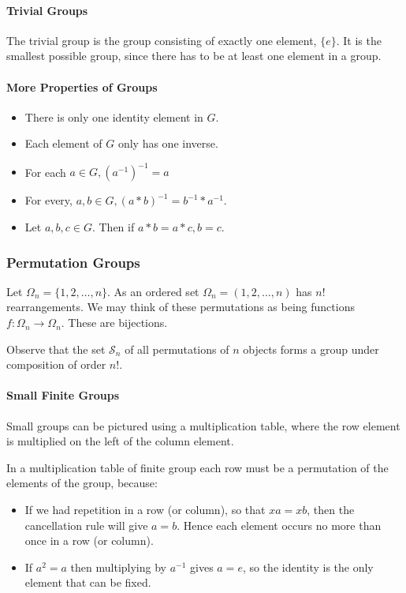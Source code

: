 \paragraph{Trivial Groups}
The trivial group is the group consisting of exactly one element, \(\{e\}\). It is the smallest possible group, since there has to be at least one element in a group.

\paragraph{More Properties of Groups}
\begin{itemize}
    \item There is only one identity element in \(G\).
    \item Each element of \(G\) only has one inverse.
    \item For each \(a \in G, (a^{-1})^{-1} = a\)
    \item For every, \(a,b \in G, (a *  b)^{-1} = b^{-1} * a^{-1}\).
    \item Let \(a,b,c \in G\). Then if \(a * b = a * c, b = c\). 
\end{itemize}

\subsubsection{Permutation Groups}
Let \(\Omega_n = \{1,2,\dots,n\}\). As an ordered set \(\Omega_n = (1,2,\dots,n)\) has \(n!\) rearrangements. We may think of these permutations as being functions \(f:\Omega_n \to \Omega_n\). These are bijections.

Observe that the set \(\mathcal{S}_n\) of all permutations of \(n\) objects forms a group under composition of order \(n!\).

\paragraph{Small Finite Groups}
Small groups can be pictured using a multiplication table, where the row element is multiplied on the left of the column element.

In a multiplication table of finite group each row must be a permutation of the elements of the group, because:
\begin{itemize}
    \item If we had repetition in a row (or column), so that \(xa = xb\), then the cancellation rule will give \(a=b\). Hence each element occurs no more than once in a row (or column).
    \item If \(a^2 = a\) then multiplying by \(a^{-1}\) gives \(a=e\), so the identity is the only element that can be fixed.
\end{itemize}

